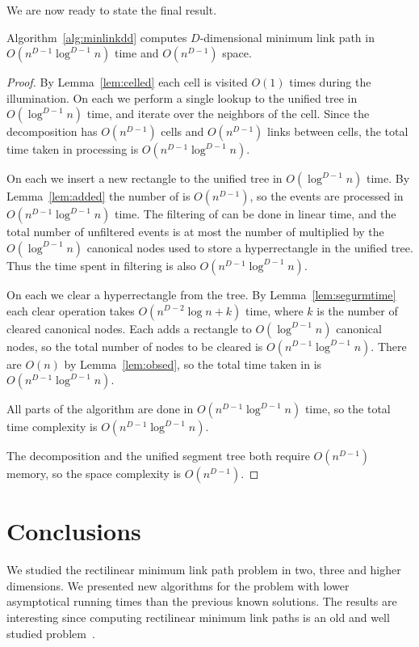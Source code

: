 \documentclass[english,gradu]{tktltiki2018}
\begin{document}
We are now ready to state the final result.

\begin{theo}Algorithm~\ref{alg:minlinkdd} computes $D$-dimensional minimum link path in $O(n^{D-1}\log^{D-1}n)$ time and $O(n^{D-1})$ space.\end{theo}
\begin{proof}
By Lemma~\ref{lem:celled} each cell is visited $O(1)$ times during the illumination.
On each \cellE we perform a single lookup to the unified tree in $O(\log^{D-1} n)$ time, and iterate over the neighbors of the cell.
Since the decomposition has $O(n^{D-1})$ cells and $O(n^{D-1})$ links between cells, the total time taken in processing \cellEs is $O(n^{D-1}\log^{D-1} n)$.

On each \addE we insert a new rectangle to the unified tree in $O(\log^{D-1} n)$ time.
By Lemma~\ref{lem:added} the number of \addEs is $O(n^{D-1})$, so the events are processed in $O(n^{D-1}\log^{D-1} n)$ time.
The filtering of \addEs can be done in linear time, and the total number of unfiltered events is at most the number of \addEs multiplied by the $O(\log^{D-1} n)$ canonical nodes used to store a hyperrectangle in the unified tree.
Thus the time spent in filtering is also $O(n^{D-1}\log^{D-1} n)$.

On each \obsE we clear a hyperrectangle from the tree.
By Lemma~\ref{lem:segurmtime} each clear operation takes $O(n^{D-2}\log n + k)$ time, where $k$ is the number of cleared canonical nodes.
Each \addE adds a rectangle to $O(\log^{D-1} n)$ canonical nodes, so the total number of nodes to be cleared is $O(n^{D-1}\log^{D-1} n)$.
There are $O(n)$ \obsEs by Lemma~\ref{lem:obsed}, so the total time taken in \obsEs is $O(n^{D-1}\log^{D-1} n)$.

All parts of the algorithm are done in $O(n^{D-1}\log^{D-1} n)$ time, so the total time complexity is $O(n^{D-1}\log^{D-1} n)$.

The decomposition and the unified segment tree both require $O(n^{D-1})$ memory, so the space complexity is $O(n^{D-1})$.
\end{proof}



\section{Conclusions}\label{sec:conclusions}

We studied the rectilinear minimum link path problem in two, three and higher dimensions.
We presented new algorithms for the problem with lower asymptotical running times than the previous known solutions.
The results are interesting since computing rectilinear minimum link paths is an old and well studied problem~\cite{restricted,wagner}.
\end{document}
